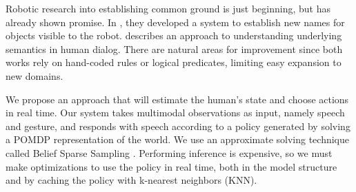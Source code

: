 \documentclass[letterpaper]{article}
\newcommand{\stnote}[1]{\textcolor{blue}{\textbf{ST: #1}}}
\begin{document}


Robotic research into establishing common ground is just beginning, but has already shown promise. In \cite{chai14}, they developed a system to establish new names for objects visible to the robot. \cite{williams15} describes an approach to understanding underlying semantics in human dialog. There are natural areas for improvement since both works rely on hand-coded rules or logical predicates, limiting easy expansion to new domains. 






We propose an approach that will estimate the human's state and choose actions
in real time. Our system takes multimodal observations
as input, namely speech and gesture, and responds with speech according to a policy generated by solving a POMDP representation of the world.  We use an approximate solving technique
called Belief Sparse Sampling \cite{kearns02}. Performing inference is expensive, so we must
make optimizations to use the policy in real time, both in the model structure and by
caching the policy with k-nearest neighbors (KNN).


\end{document}
